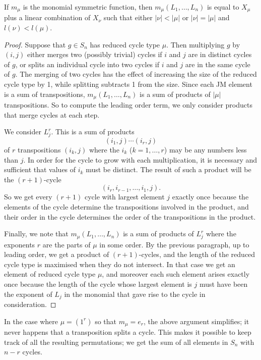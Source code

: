 \documentclass[ALCO,Unicode]{cedram}
\begin{document}
\begin{proposition} \label{murphy_prop}
If $m_\mu$ is the monomial symmetric function, then $m_\mu(L_1, \ldots, L_n)$ is equal to $X_\mu$ plus a linear combination of $X_\nu$ such that either $|\nu| < |\mu|$ or $|\nu| = |\mu|$ and $l(\nu) < l(\mu)$.
\end{proposition}
\begin{proof}
Suppose that $g \in S_n$ has reduced cycle type $\mu$. Then multiplying $g$ by $(i,j)$ either merges two (possibly trivial) cycles if $i$ and $j$ are in distinct cycles of $g$, or splits an individual cycle into two cycles if $i$ and $j$ are in the same cycle of $g$. The merging of two cycles has the effect of increasing the size of the reduced cycle type by 1, while splitting subtracts 1 from the size. Since each JM element is a sum of transpositions, $m_\mu(L_1, \ldots, L_n)$ is a sum of products of $|\mu|$ transpositions. So to compute the leading order term, we only consider products that merge cycles at each step.

We consider $L_j^r$. This is a sum of products
\[
(i_1, j)\cdots (i_r,j)
\]
of $r$ transpositions $(i_k,j)$ where the $i_k$ ($k=1,\ldots,r$) may be any numbers less than $j$. In order for the cycle to grow with each multiplication, it is necessary and sufficient that values of $i_k$ must be distinct. The result of such a product will be the $(r+1)$-cycle
\[
(i_r, i_{r-1}, \ldots, i_1, j).
\]
So we get every $(r+1)$ cycle with largest element $j$ exactly once because the elements of the cycle determine the transpositions involved in the product, and their order in the cycle determines the order of the transpositions in the product.

Finally, we note that $m_\mu(L_1, \ldots, L_n)$ is a sum of products of $L_j^r$ where the exponents $r$ are the parts of $\mu$ in some order. By the previous paragraph, up to leading order, we get a product of $(r+1)$-cycles, and the length of the reduced cycle type is maximised when they do not intersect. In that case we get an element of reduced cycle type $\mu$, and moreover each such element arises exactly once because the length of the cycle whose largest element is $j$ must have been the exponent of $L_j$ in the monomial that gave rise to the cycle in consideration.
\end{proof}

In the case where $\mu = (1^r)$ so that $m_\mu = e_r$, the above argument simplifies; it never happens that a transposition splits a cycle. This makes it possible to keep track of all the resulting permutations; we get the sum of all elements in $S_n$ with $n-r$ cycles.
\end{document}
